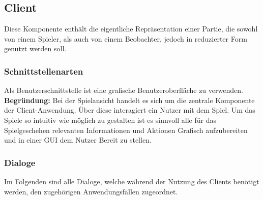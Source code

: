 \subsection{Client}
Diese Komponente enthält die eigentliche Repräsentation einer Partie, die sowohl von einem Spieler, als auch von einem Beobachter, jedoch in reduzierter Form genutzt werden soll.

\subsubsection{Schnittstellenarten}
Als Benutzerschnittstelle ist eine grafische Benutzeroberfläche zu verwenden. \\ \textbf{Begründung:} Bei der Spielansicht handelt es sich um die zentrale Komponente der Client-Anwendung. Über diese interagiert ein Nutzer mit dem Spiel. Um das Spiele so intuitiv wie möglich zu gestalten ist es sinnvoll alle für das Spielgeschehen relevanten Informationen und Aktionen Grafisch aufzubereiten und in einer GUI dem Nutzer Bereit zu stellen. 

\subsubsection{Dialoge}
Im Folgenden sind alle Dialoge, welche während der Nutzung des Clients benötigt werden, den zugehörigen Anwendungsfällen zugeordnet. 

